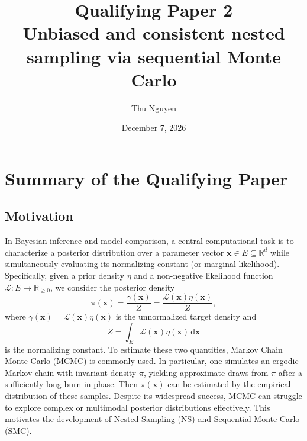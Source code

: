 \documentclass[11pt]{article}
\title{
  \large Qualifying Paper 2 \\[0.5em] 
  \LARGE Unbiased and consistent nested sampling via sequential Monte Carlo
}
\author{Thu Nguyen}
\date{December 7, 2026}
\begin{document}
\maketitle
\tableofcontents
\newpage
\section{Summary of the Qualifying Paper}\label{sec:summary} %
\subsection{Motivation}

In Bayesian inference and model comparison, a central computational task is to characterize a posterior distribution over a parameter vector $\mathbf{x} \in E \subseteq \mathbb{R}^d$ while simultaneously evaluating its normalizing constant (or marginal likelihood). Specifically, given a prior density $\eta$ and a non-negative likelihood function $\mathcal{L}: E \to \mathbb{R}_{\geq 0}$, we consider the posterior density
\begin{equation}\label{eq:post_full}
    \pi(\mathbf{x}) = \frac{\gamma(\mathbf{x})}{Z} = \frac{\mathcal{L}(\mathbf{x})\eta(\mathbf{x})}{Z},
\end{equation}
where $\gamma(\mathbf{x}) = \mathcal{L}(\mathbf{x})\eta(\mathbf{x})$ is the unnormalized target density and
\begin{equation}
    Z = \int_E \mathcal{L}(\mathbf{x})\eta(\mathbf{x})\,\mathrm{d}\mathbf{x}
\end{equation}
is the normalizing constant. To estimate these two quantities, Markov Chain Monte Carlo (MCMC) is commonly used. 
In particular, one simulates an ergodic Markov chain with invariant density $\pi$, yielding approximate draws from $\pi$ after a sufficiently long burn-in phase.
Then $\pi(\mathbf{x})$ can be estimated by the empirical distribution of these samples. 
Despite its widespread success, MCMC can struggle to explore complex or multimodal posterior distributions effectively.
This motivates the development of Nested Sampling (NS) and Sequential Monte Carlo (SMC). 
\end{document}
